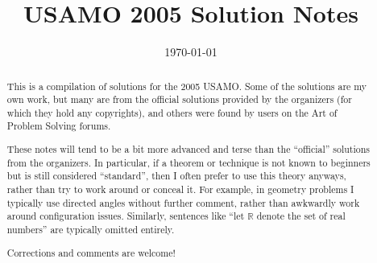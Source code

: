 \documentclass[11pt]{scrartcl}
\title{USAMO 2005 Solution Notes}
\date{\today}
\begin{document}
\maketitle

\begin{abstract}
This is a compilation of solutions
for the 2005 USAMO.
Some of the solutions are my own work,
but many are from the official solutions provided by the organizers
(for which they hold any copyrights),
and others were found by users on the Art of Problem Solving forums.

These notes will tend to be a bit more advanced and terse than the ``official''
solutions from the organizers.
In particular, if a theorem or technique is not known to beginners
but is still considered ``standard'', then I often prefer to
use this theory anyways, rather than try to work around or conceal it.
For example, in geometry problems I typically use directed angles
without further comment, rather than awkwardly work around configuration issues.
Similarly, sentences like ``let $\mathbb{R}$ denote the set of real numbers''
are typically omitted entirely.

Corrections and comments are welcome!
\end{abstract}

\tableofcontents
\newpage

\addtocounter{section}{-1}
\end{document}
